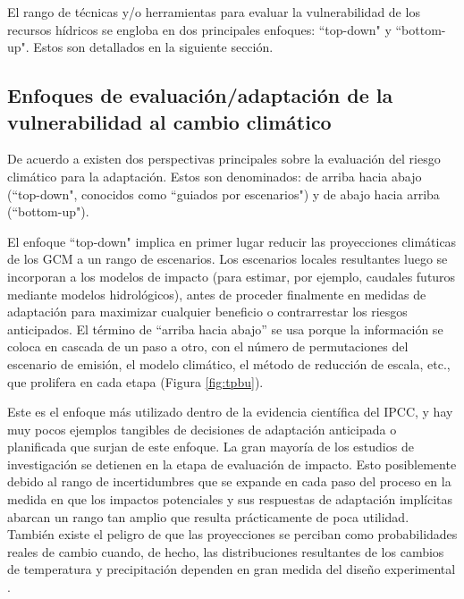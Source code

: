 \documentclass[12pt]{article}
\begin{document}
El rango de técnicas y/o herramientas para evaluar la vulnerabilidad de los recursos hídricos se engloba en dos principales enfoques: “top-down" y “bottom-up". Estos son detallados en la siguiente sección.



\subsection{Enfoques de evaluación/adaptación de la vulnerabilidad al cambio climático}

De acuerdo a \citet{Wilby2010} existen dos perspectivas principales sobre la evaluación del riesgo climático para la adaptación. Estos son denominados: de arriba hacia abajo (“top-down", conocidos como ``guiados por escenarios") y de abajo hacia arriba (“bottom-up").

El enfoque “top-down" implica en primer lugar reducir las proyecciones climáticas de los GCM a un rango de escenarios. Los escenarios locales resultantes luego se incorporan a los modelos de impacto (para estimar, por ejemplo, caudales futuros mediante modelos hidrológicos), antes de proceder finalmente en medidas de adaptación para maximizar cualquier beneficio o contrarrestar los riesgos anticipados. El término de “arriba hacia abajo” se usa porque la información se coloca en cascada de un paso a otro, con el número de permutaciones del escenario de emisión, el modelo climático, el método de reducción de escala, etc., que prolifera en cada etapa (Figura \ref{fig:tpbu}). 

Este es el enfoque más utilizado dentro de la evidencia científica del IPCC, y hay muy pocos ejemplos tangibles de decisiones de adaptación anticipada o planificada que surjan de este enfoque. La gran mayoría de los estudios de investigación se detienen en la etapa de evaluación de impacto. Esto posiblemente debido al rango de incertidumbres que se expande en cada paso del proceso en la medida en que los impactos potenciales y sus respuestas de adaptación implícitas abarcan un rango tan amplio que resulta prácticamente de poca utilidad. También existe el peligro de que las proyecciones se perciban como probabilidades reales de cambio cuando, de hecho, las distribuciones resultantes de los cambios de temperatura y precipitación dependen en gran medida del diseño experimental \citep{Dessai2004}. 


\end{document}
